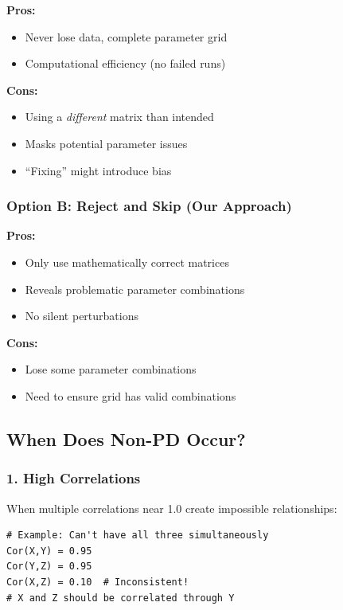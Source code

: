 \documentclass[11pt]{article}
\begin{document}
\textbf{Pros:}
\begin{itemize}
    \item Never lose data, complete parameter grid
    \item Computational efficiency (no failed runs)
\end{itemize}

\textbf{Cons:}
\begin{itemize}
    \item Using a \emph{different} matrix than intended
    \item Masks potential parameter issues
    \item ``Fixing'' might introduce bias
\end{itemize}

\subsubsection{Option B: Reject and Skip (Our Approach)}

\textbf{Pros:}
\begin{itemize}
    \item Only use mathematically correct matrices
    \item Reveals problematic parameter combinations
    \item No silent perturbations
\end{itemize}

\textbf{Cons:}
\begin{itemize}
    \item Lose some parameter combinations
    \item Need to ensure grid has valid combinations
\end{itemize}

\subsection{When Does Non-PD Occur?}

\subsubsection{1. High Correlations}

When multiple correlations near 1.0 create impossible relationships:

\begin{lstlisting}[style=Rstyle]
# Example: Can't have all three simultaneously
Cor(X,Y) = 0.95
Cor(Y,Z) = 0.95
Cor(X,Z) = 0.10  # Inconsistent!
# X and Z should be correlated through Y
\end{lstlisting}
\end{document}
